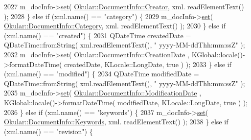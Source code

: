 \begin{DoxyCode}
2027                     m\_docInfo->\hyperlink{classOkular_1_1DocumentInfo_a8bd5403394ab192f1103cbf2a8e48d9b}{set}( \hyperlink{classOkular_1_1DocumentInfo_a3a6e5f7fb246e29bcb2e830b6f770791ab361aa9681b157d8d81e52f440bf646f}{Okular::DocumentInfo::Creator}, xml.
      readElementText() );
2028                 \} \textcolor{keywordflow}{else} \textcolor{keywordflow}{if} (xml.name() == \textcolor{stringliteral}{"category"}) \{
2029                     m\_docInfo->\hyperlink{classOkular_1_1DocumentInfo_a8bd5403394ab192f1103cbf2a8e48d9b}{set}( \hyperlink{classOkular_1_1DocumentInfo_a3a6e5f7fb246e29bcb2e830b6f770791a1c5f3f7912efdbeff34d16608375c97a}{Okular::DocumentInfo::Category}, xml.
      readElementText() );
2030                 \} \textcolor{keywordflow}{else} \textcolor{keywordflow}{if} (xml.name() == \textcolor{stringliteral}{"created"}) \{
2031                     QDateTime createdDate = QDateTime::fromString( xml.readElementText(), \textcolor{stringliteral}{"
      yyyy-MM-ddThh:mm:ssZ"} );
2032                     m\_docInfo->\hyperlink{classOkular_1_1DocumentInfo_a8bd5403394ab192f1103cbf2a8e48d9b}{set}( \hyperlink{classOkular_1_1DocumentInfo_a3a6e5f7fb246e29bcb2e830b6f770791a58a72aeacd3cb08e85d0f9f19b2fe83a}{Okular::DocumentInfo::CreationDate}
      , KGlobal::locale()->formatDateTime( createdDate, KLocale::LongDate, \textcolor{keyword}{true} ) );
2033                 \} \textcolor{keywordflow}{else} \textcolor{keywordflow}{if} (xml.name() == \textcolor{stringliteral}{"modified"}) \{
2034                     QDateTime modifiedDate = QDateTime::fromString( xml.readElementText(), \textcolor{stringliteral}{"
      yyyy-MM-ddThh:mm:ssZ"} );
2035                     m\_docInfo->\hyperlink{classOkular_1_1DocumentInfo_a8bd5403394ab192f1103cbf2a8e48d9b}{set}( \hyperlink{classOkular_1_1DocumentInfo_a3a6e5f7fb246e29bcb2e830b6f770791a0191dfd9c2c5b7f210a641b082a23969}{Okular::DocumentInfo::ModificationDate}
      , KGlobal::locale()->formatDateTime( modifiedDate, KLocale::LongDate, \textcolor{keyword}{true} ) );
2036                 \} \textcolor{keywordflow}{else} \textcolor{keywordflow}{if} (xml.name() == \textcolor{stringliteral}{"keywords"}) \{
2037                     m\_docInfo->\hyperlink{classOkular_1_1DocumentInfo_a8bd5403394ab192f1103cbf2a8e48d9b}{set}( \hyperlink{classOkular_1_1DocumentInfo_a3a6e5f7fb246e29bcb2e830b6f770791a833799005454e6c7e389dcceddd42b19}{Okular::DocumentInfo::Keywords}, xml.
      readElementText() );
2038                 \} \textcolor{keywordflow}{else} \textcolor{keywordflow}{if} (xml.name() == \textcolor{stringliteral}{"revision"}) \{

\end{DoxyCode}
